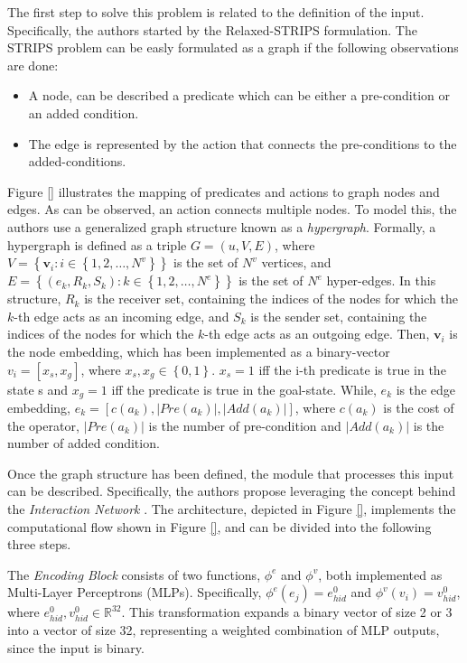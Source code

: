 The first step to solve this problem is related to the definition of the input. Specifically, the authors started by the Relaxed-STRIPS formulation. The STRIPS problem can be easly formulated as a graph if the following observations are done:
\begin{itemize}
    \item A node, can be described a predicate which can be either a pre-condition or an added condition.
    \item The edge is represented by the action that connects the pre-conditions to the added-conditions. 
\end{itemize}
Figure \ref{} illustrates the mapping of predicates and actions to graph nodes and edges. As can be observed, an action connects multiple nodes. To model this, the authors use a generalized graph structure known as a \textit{hypergraph}. Formally, a hypergraph is defined as a triple $G = (u, V, E)$, where $V = \left\{ \textbf{v}_{i}: i \in \left\{1, 2, \dots, N^{v} \right\} \right\}$ is the set of $N^{v}$ vertices, and $E = \left\{ (e_{k}, R_{k}, S_{k}): k \in \left\{1, 2, \dots, N^{e} \right\} \right\}$ is the set of $N^{e}$ hyper-edges. In this structure, $R_{k}$ is the receiver set, containing the indices of the nodes for which the $k$-th edge acts as an incoming edge, and $S_{k}$ is the sender set, containing the indices of the nodes for which the $k$-th edge acts as an outgoing edge. Then, $\textbf{v}_{i}$ is the node embedding, which has been implemented as a binary-vector $v_i = [x_s, x_g]$, where $x_s, x_g \in \left\{0,1\right\}$. $x_s=1$ iff the i-th predicate is true in the state s and $x_g=1$ iff the predicate is true in the goal-state. While, $e_{k}$ is the edge embedding, $e_k = [c(a_k), |Pre(a_k)|, |Add(a_k)|]$, where $c(a_k)$ is the cost of the operator, $|Pre(a_k)|$ is the number of pre-condition and $|Add(a_k)|$ is the number of added condition.

Once the graph structure has been defined, the module that processes this input can be described. Specifically, the authors propose leveraging the concept behind the \textit{Interaction Network} \cite{battaglia2016interaction}. The architecture, depicted in Figure \ref{}, implements the computational flow shown in Figure \ref{}, and can be divided into the following three steps.

The \textit{Encoding Block} consists of two functions, $\phi^{e}$ and $\phi^{v}$, both implemented as Multi-Layer Perceptrons (MLPs). Specifically, $\phi^{e}(e_j) = e_{hid}^{0}$ and $\phi^{v}(v_i) = v_{hid}^{0}$, where $e_{hid}^{0}, v_{hid}^{0} \in \mathbb{R}^{32}$. This transformation expands a binary vector of size 2 or 3 into a vector of size 32, representing a weighted combination of MLP outputs, since the input is binary.

